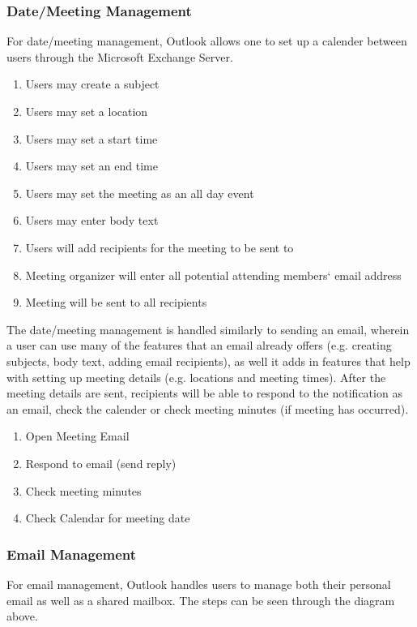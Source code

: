 \documentclass{sigchi}
\begin{document}
\subsubsection{Date/Meeting Management}

For date/meeting management, Outlook allows one to set up a calender between users through the Microsoft Exchange Server.
\begin{enumerate}
\item Users may create a subject
\item Users may set a location
\item Users may set a start time
\item Users may set an end time
\item Users may set the meeting as an all day event
\item Users may enter body text
\item Users will add recipients for the meeting to be sent to
\item Meeting organizer will enter all potential attending members` email address
\item Meeting will be sent to all recipients
\end{enumerate}

The date/meeting management is handled similarly to sending an email, wherein a user can use many of the features that an email already offers (e.g. creating subjects, body text, adding email recipients), as well it adds in features that help with setting up meeting details (e.g. locations and meeting times).
After the meeting details are sent, recipients will be able to respond to the notification as an email, check the calender or check meeting minutes (if meeting has occurred).


\begin{enumerate}
\item Open Meeting Email
\item Respond to email (send reply)
\item Check meeting minutes
\item Check Calendar for meeting date
\end{enumerate}

\subsubsection{Email Management}

For email management, Outlook handles users to manage both their personal email as well as a shared mailbox.  The steps can be seen through the diagram above.
\end{document}
